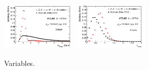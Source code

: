 \begin{figure}[tp]
  \includegraphics[width=0.32\textwidth]{figures/PERF-2013-06/figaux_12}
  \includegraphics[width=0.32\textwidth]{figures/PERF-2013-06/figaux_13}
  \caption{Variables.}
  \label{fig:tauid-inputs-3p}
\end{figure}

\clearpage



